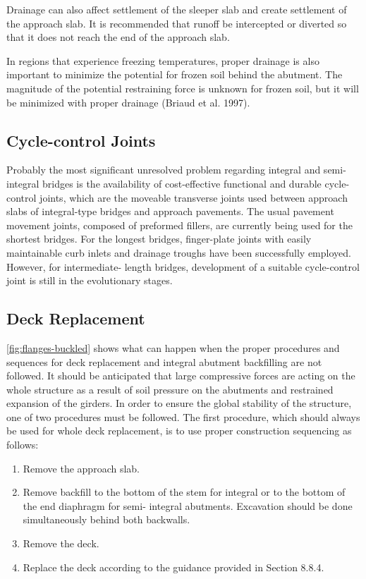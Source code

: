 Drainage can also affect settlement of the sleeper slab and create settlement of the approach slab. It is
recommended that runoff be intercepted or diverted so that it does not reach the end of the approach slab.

In regions that experience freezing temperatures, proper drainage is also important to minimize the potential for
frozen soil behind the abutment. The magnitude of the potential restraining force is unknown for frozen soil, but it
will be minimized with proper drainage (Briaud et al. 1997).

\subsection{Cycle-control Joints}
Probably the most significant unresolved problem regarding integral and semi-integral bridges is the availability
of cost-effective functional and durable cycle-control joints, which are the moveable transverse joints used between
approach slabs of integral-type bridges and approach pavements. The usual pavement movement joints, composed of
preformed fillers, are currently being used for the shortest bridges. For the longest bridges, finger-plate joints with
easily maintainable curb inlets and drainage troughs have been successfully employed. However, for intermediate-
length bridges, development of a suitable cycle-control joint is still in the evolutionary stages.

\subsection{Deck Replacement}
\cref{fig:flanges-buckled} shows what can happen when the proper procedures and sequences for deck replacement and integral
abutment backfilling are not followed. It should be anticipated that large compressive forces are acting on the whole
structure as a result of soil pressure on the abutments and restrained expansion of the girders. In order to ensure the
global stability of the structure, one of two procedures must be followed. The first procedure, which should always be
used for whole deck replacement, is to use proper construction sequencing as follows:
\begin{enumerate}
  \item Remove the approach slab.
  \item Remove backfill to the bottom of the stem for integral or to the bottom of the end diaphragm for semi-
integral abutments. Excavation should be done simultaneously behind both backwalls.
  \item Remove the deck.
  \item Replace the deck according to the guidance provided in Section 8.8.4.
\end{enumerate}

